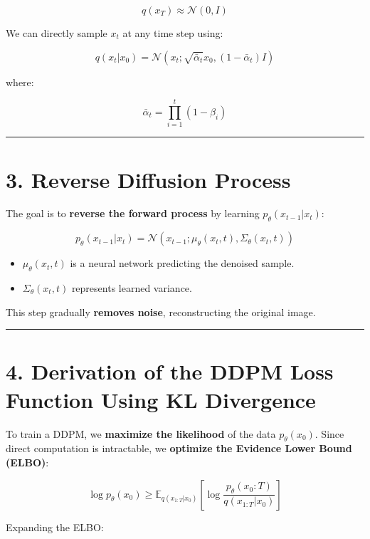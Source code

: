 \documentclass[
]{book}
\providecommand{\tightlist}{%
  \setlength{\itemsep}{0pt}\setlength{\parskip}{0pt}}
\begin{document}
\[
q(x_T) \approx \mathcal{N}(0, I)
\]

We can directly sample \(x_t\) at any time step using:

\[
q(x_t | x_0) = \mathcal{N}(x_t ; \sqrt{\bar{\alpha}_t} x_0, (1 - \bar{\alpha}_t) I)
\]

where:

\[
\bar{\alpha}_t = \prod_{i=1}^{t} (1 - \beta_i)
\]

\begin{center}\rule{0.5\linewidth}{0.5pt}\end{center}

\section{3. Reverse Diffusion Process}\label{reverse-diffusion-process}

The goal is to \textbf{reverse the forward process} by learning \(p_\theta(x_{t-1} | x_t)\):

\[
p_\theta(x_{t-1} | x_t) = \mathcal{N}(x_{t-1} ; \mu_\theta(x_t, t), \Sigma_\theta(x_t, t))
\]

\begin{itemize}
\tightlist
\item
  \(\mu_\theta(x_t, t)\) is a neural network predicting the denoised sample.
\item
  \(\Sigma_\theta(x_t, t)\) represents learned variance.
\end{itemize}

This step gradually \textbf{removes noise}, reconstructing the original image.

\begin{center}\rule{0.5\linewidth}{0.5pt}\end{center}

\section{4. Derivation of the DDPM Loss Function Using KL Divergence}\label{derivation-of-the-ddpm-loss-function-using-kl-divergence}

To train a DDPM, we \textbf{maximize the likelihood} of the data \(p_\theta(x_0)\). Since direct computation is intractable, we \textbf{optimize the Evidence Lower Bound (ELBO)}:

\[
\log p_\theta(x_0) \geq \mathbb{E}_{q(x_{1:T} | x_0)} \left[ \log \frac{p_\theta(x_0:T)}{q(x_{1:T} | x_0)} \right]
\]

Expanding the ELBO:
\end{document}
